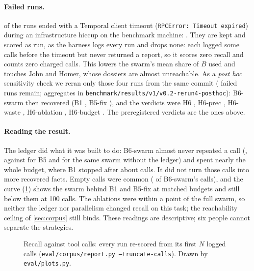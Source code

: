 \paragraph{Failed runs.}  of the  runs ended with a Temporal client timeout (\texttt{RPCError: Timeout expired}) during an infrastructure hiccup on the benchmark machine: . They are kept and scored as run, as the harness logs every run and drops none: each logged some calls before the timeout but never returned a report, so it scores zero recall and counts zero charged calls. This lowers the swarm's mean share of $B$ used and touches John and Homer, whose dossiers are almost unreachable. As a \emph{post hoc} sensitivity check we reran only those four runs from the same commit ( failed runs remain; aggregates in \texttt{benchmark/results/v1/v0.2-rerun4-posthoc}): B6-swarm then recovered  (B1 , B5-fix ), and the verdicts were H6 , H6-prec , H6-waste , H6-ablation , H6-budget . The preregistered verdicts are the ones above.

\paragraph{Reading the result.} The ledger did what it was built to do: B6-swarm almost never repeated a call (, against  for B5 and  for the same swarm without the ledger) and spent nearly the whole budget, where B1 stopped after about  calls. It did not turn those calls into more recovered facts. Empty calls were common ( of B6-swarm's calls), and the curve (\cref{fig:rvc}) shows the swarm behind B1 and B5-fix at matched budgets and still below them at 100 calls. The ablations were within a point of the full swarm, so neither the ledger nor parallelism changed recall on this task; the reachability ceiling of \cref{sec:corpus} still binds. These readings are descriptive; six people cannot separate the strategies.

\begin{figure}[t]\centering
{}
\caption{Recall against tool calls: every run re-scored from its first $N$ logged calls (\texttt{eval/corpus/report.py --truncate-calls}). Drawn by \texttt{eval/plots.py}.}
\label{fig:rvc}
\end{figure}

